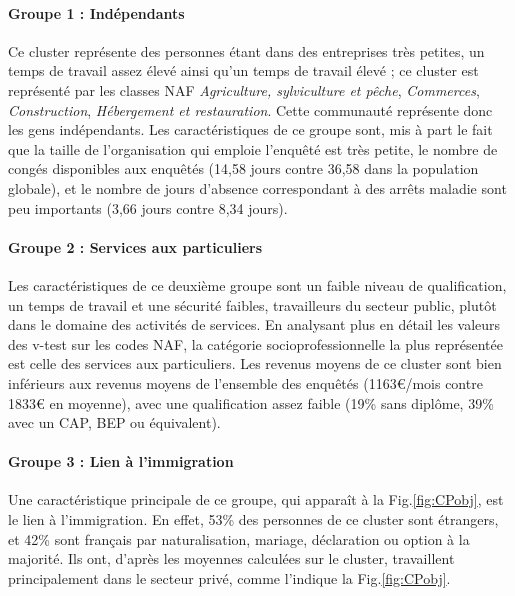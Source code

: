 \documentclass[11pt,fleqn,a4paper,openany,frenchb]{book} %
\begin{document}
\paragraph{Groupe 1 : Indépendants\\}
Ce cluster représente des personnes étant dans des entreprises très petites, un temps de travail assez élevé ainsi qu'un temps de travail élevé ; ce cluster est représenté par les classes NAF \textit{Agriculture, sylviculture et pêche}, \textit{Commerces}, \textit{Construction}, \textit{Hébergement et restauration}. Cette communauté représente donc les gens indépendants. Les caractéristiques de ce groupe sont, mis à part le fait que la taille de l'organisation qui emploie l'enquêté est très petite, le nombre de congés disponibles aux enquêtés (14,58 jours contre 36,58 dans la population globale), et le nombre de jours d'absence correspondant à des arrêts maladie sont peu importants (3,66 jours contre 8,34 jours).

\paragraph{Groupe 2 : Services aux particuliers\\}
Les caractéristiques de ce deuxième groupe sont un faible niveau de qualification, un temps de travail et une sécurité faibles, travailleurs du secteur public, plutôt dans le domaine des activités de services. En analysant plus en détail les valeurs des v-test sur les codes NAF, la catégorie socioprofessionnelle la plus représentée est celle des services aux particuliers. Les revenus moyens de ce cluster sont bien inférieurs aux revenus moyens de l'ensemble des enquêtés (1163\euro{}/mois contre 1833\euro{} en moyenne), avec une qualification assez faible (19\% sans diplôme, 39\% avec un CAP, BEP ou équivalent).

\paragraph{Groupe 3 : Lien à l'immigration\\}
Une caractéristique principale de ce groupe, qui apparaît à la Fig.\ref{fig:CPobj}, est le lien à l'immigration. En effet, 53\% des personnes de ce cluster sont étrangers, et 42\% sont français par naturalisation, mariage, déclaration ou option à la majorité. Ils ont, d'après les moyennes calculées sur le cluster, travaillent principalement dans le secteur privé, comme l'indique la Fig.\ref{fig:CPobj}.
\end{document}
